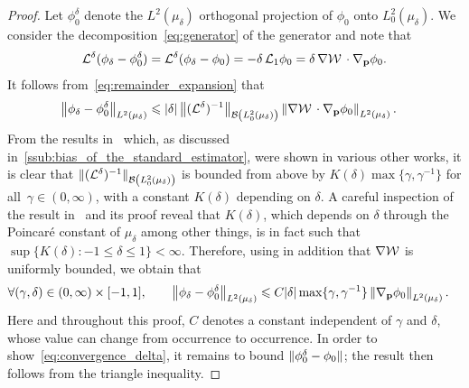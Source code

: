 \documentclass[11pt,a4paper]{article}
\begin{document}
\begin{proof}
    Let $\phi_0^{\delta}$ denote the $L^2(\mu_{\delta})$ orthogonal projection of $\phi_0$ onto $L^2_0(\mu_{\delta})$.
    We consider the decomposition~\eqref{eq:generator} of the generator and note that
    \begin{equation}
        \label{eq:remainder_expansion}
        \mathcal L^{\delta}(\phi_\delta - \phi_0^{\delta})
        = \mathcal L^{\delta}(\phi_\delta - \phi_0)
        = - \delta \, \mathcal L_1 \phi_0
        = \delta \, \nabla \mathcal W \, \cdot \nabla_{\boldsymbol{\mathbf p}} \phi_0.
    \end{equation}
    It follows from~\eqref{eq:remainder_expansion} that
     \begin{align*}
         \norm{\phi_\delta - \phi_0^{\delta}}[L^2(\mu_{\delta})]
         &\leq \lvert \delta \rvert \norm{(\mathcal L^{\delta})^{-1}} [\mathcal B\left(L^2_0(\mu_{\delta})\right)]
         \norm{\grad \mathcal W \, \cdot \grad_{\vect p} \phi_0}[L^2(\mu_{\delta})].
     \end{align*}
     From the results in~\cite[Section 3.1]{BFLS20} which,
     as discussed in~\cref{ssub:bias_of_the_standard_estimator},
     were shown in various other works,
     it is clear that
     $\norm*{(\mathcal L^{\delta})^{-1}}[\mathcal B \left( L^2_{0}(\mu_{\delta})\right)] $ is bounded from above by $K(\delta) \max\{\gamma, \gamma^{-1}\}$ for all~$\gamma \in (0, \infty)$,
     with a constant $K(\delta)$ depending on $\delta$.
     A careful inspection of the result in~\cite{BFLS20} and its proof reveal that $K(\delta)$,
     which depends on $\delta$ through the Poincaré constant of $\mu_{\delta}$ among other things,
     is in fact such that $\sup \{K(\delta): -1 \leq \delta \leq 1\} < \infty$.
     Therefore,
     using in addition that $\nabla \mathcal W$ is uniformly bounded,
     we obtain that
     \begin{align}
         \label{eq:convergence_l2}
         \forall (\gamma, \delta) \in (0, \infty) \times [-1, 1], \qquad
         \norm{\phi_\delta - \phi_0^{\delta}}[L^2(\mu_{\delta})]
         &\leq C \lvert \delta \rvert \max\{\gamma, \gamma^{-1}\}
         \norm{\grad_{\vect p} \phi_0}[L^2(\mu_{\delta})].
     \end{align}
    Here and throughout this proof, $C$ denotes a constant independent of $\gamma$ and $\delta$,
    whose value can change from occurrence to occurrence.
    In order to show~\eqref{eq:convergence_delta},
    it remains to bound $\norm*{\phi_0^{\delta}- \phi_0}$;
    the result then follows from the triangle inequality.

\end{proof}
\end{document}
